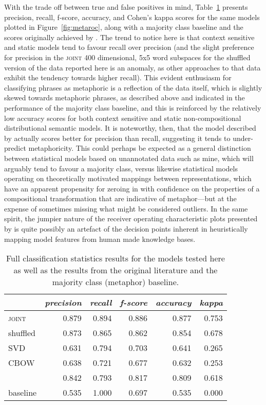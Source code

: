 With the trade off between true and false positives in mind, Table~\ref{tab:metastats} presents precision, recall, f-score, accuracy, and Cohen's kappa scores for the same models plotted in Figure~\ref{fig:metaroc}, along with a majority class baseline and the scores originally achieved by \cite{GutierrezEA2016}.  The trend to notice here is that context sensitive and static models tend to favour recall over precision (and the slight preference for precision in the \textsc{joint} 400 dimensional, 5x5 word subspaces for the shuffled version of the data reported here is an anomaly, as other approaches to that data exhibit the tendency towards higher recall).  This evident enthusiasm for classifying phrases as metaphoric is a reflection of the data itself, which is slightly skewed towards metaphoric phrases, as described above and indicated in the performance of the majority class baseline, and this is reinforced by the relatively low accuracy scores for both context sensitive and static non-compositional distributional semantic models.  It is noteworthy, then, that the model described by \cite{GutierrezEA2016} actually scores better for precision than recall, suggesting it tends to under-predict metaphoricity.  This could perhaps be expected as a general distinction between statistical models based on unannotated data such as mine, which will arguably tend to favour a majority class, versus likewise statistical models operating on theoretically motivated mappings between representations, which have an apparent propensity for zeroing in with confidence on the properties of a compositional transformation that are indicative of metaphor---but at the expense of sometimes missing what might be considered outliers.  In the same spirit, the jumpier nature of the receiver operating characteristic plots presented by \cite{TsvetkovEA2014} is quite possibly an artefact of the decision points inherent in heuristically mapping model features from human made knowledge bases.

\begin{table}
\centering
\begin{tabular}{lrrrrr}
\hline
\ & \emph{precision} & \emph{recall} & \emph{f-score} & \emph{accuracy} & \emph{kappa} \\
\hline
\textsc{joint} & 0.879 & 0.894 & 0.886 & 0.877 & 0.753\\
shuffled & 0.873 & 0.865 & 0.862 & 0.854 & 0.678 \\
\textsc{SVD} & 0.631 & 0.794 & 0.703 & 0.641 & 0.265 \\
\textsc{CBOW} & 0.638 & 0.721 & 0.677 & 0.632 & 0.253 \\
\cite{GutierrezEA2016} & 0.842 & 0.793 & 0.817 & 0.809 & 0.618 \\
baseline & 0.535 & 1.000 & 0.697 & 0.535 & 0.000 \\
\hline
\end{tabular}
\caption[Comparative Metaphor Classification Statistics]{Full classification statistics results for the models tested here as well as the results from the original literature and the majority class (metaphor) baseline.}
\label{tab:metastats}
\end{table}


